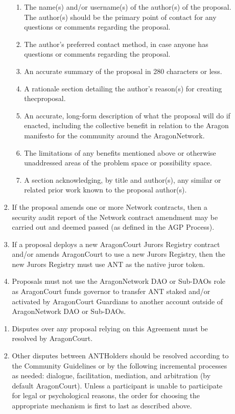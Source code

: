 \begin{enumerate}
\begin{enumerate}
\begin{enumerate}
			\begin{enumerate}
				\item The name(s) and/or username(s) of the author(s) of the proposal. The author(s) should be the primary point of contact for any questions or comments regarding the proposal.
				\item The author’s preferred contact method, in case anyone has questions or comments regarding the proposal.
				\item An accurate summary of the proposal in 280 characters or less.
				\item A rationale section detailing the author’s reason(s) for creating thecproposal.
				\item An accurate, long-form description of what the proposal will do if enacted, including the collective benefit in relation to the Aragon manifesto for the community around the \gls{AragonNetwork}.
				\item The limitations of any benefits mentioned above or otherwise unaddressed areas of the problem space or possibility space.
				\item A section acknowledging, by title and author(s), any similar or related prior work known to the proposal author(s).
			\end{enumerate}
		
			\item If the proposal amends one or more Network contracts, then a security audit report of the Network contract amendment may be carried out and deemed passed (as defined in the \ac{AGP} Process).
			\item If a proposal deploys a new \gls{AragonCourt} Jurors Registry contract and/or
			amends \gls{AragonCourt} to use a new Jurors Registry, then the new Jurors Registry must use \ac{ANT} as the native juror token.
			\item Proposals must not use the \gls{AragonNetwork} \ac{DAO} or Sub-\acp{DAO} role as \gls{AragonCourt} funds governor to transfer \ac{ANT} staked and/or activated by \gls{AragonCourt} \glspl{Guardian} to another account outside of \gls{AragonNetwork} \ac{DAO} or Sub-\acp{DAO}.
		\end{enumerate}

		\begin{enumerate}
			\item Disputes over any proposal relying on this Agreement must be resolved by \gls{AragonCourt}.
			\item Other disputes between \glspl{ANTHolder} should be resolved according to the Community Guidelines or by the following incremental processes as needed: dialogue, facilitation, mediation, and arbitration (by default \gls{AragonCourt}). Unless a participant is unable to participate for legal or psychological reasons, the order for choosing the appropriate mechanism is first to last as described above.
		\end{enumerate}


\end{enumerate}
\end{enumerate}
